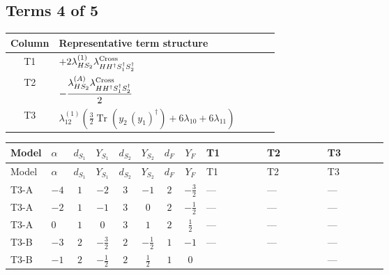 \documentclass[8pt]{article}
\begin{document}
\begin{landscape}
\subsection*{Terms 4 of 5}
\begin{center}
\begin{tabular}{@{}c >{\raggedright\arraybackslash}p{0.82\linewidth}@{}}
\toprule
Column & Representative term structure \\
\midrule
T1 & \(\displaystyle +2 {\lambda_{HS_2}^{(1)}} {\lambda_{H H^\dagger S_1^\dagger S_2^\dagger}^{\rm Cross}}\) \\
\midrule
T2 & \(\displaystyle -\frac{{\lambda_{HS_2}^{(A)}} {\lambda_{H H^\dagger S_1^\dagger S_2^\dagger}^{\rm Cross}}}{2}\) \\
\midrule
T3 & \(\displaystyle {\lambda_{12}^{(1)}} \left(\frac{3}{2} \operatorname{Tr}\!\left({y_2}\,\left({y_1}\right)^{\dagger}\right)+6 {\lambda_{10}}+6 {\lambda_{11}}\right)\) \\
\midrule
\bottomrule
\end{tabular}
\end{center}
\smallskip
\tiny
\begin{longtable}{@{}llcccccc >{\raggedright\arraybackslash}p{0.21\linewidth} >{\raggedright\arraybackslash}p{0.21\linewidth} >{\raggedright\arraybackslash}p{0.21\linewidth}@{}}
\toprule
Model & $\alpha$ & $d_{S_1}$ & $Y_{S_1}$ & $d_{S_2}$ & $Y_{S_2}$ & $d_F$ & $Y_F$ & T1 & T2 & T3 \\
\midrule
\endfirsthead
\toprule
Model & $\alpha$ & $d_{S_1}$ & $Y_{S_1}$ & $d_{S_2}$ & $Y_{S_2}$ & $d_F$ & $Y_F$ & T1 & T2 & T3 \\
\midrule
\endhead
T3-A & $-4$ & $1$ & $-2$ & $3$ & $-1$ & $2$ & $-\frac{3}{2}$ & --- & --- & --- \\
\midrule
T3-A & $-2$ & $1$ & $-1$ & $3$ & $0$ & $2$ & $-\frac{1}{2}$ & --- & --- & --- \\
\midrule
T3-A & $0$ & $1$ & $0$ & $3$ & $1$ & $2$ & $\frac{1}{2}$ & --- & --- & --- \\
\midrule
T3-B & $-3$ & $2$ & $-\frac{3}{2}$ & $2$ & $-\frac{1}{2}$ & $1$ & $-1$ & --- & --- & --- \\
\midrule
T3-B & $-1$ & $2$ & $-\frac{1}{2}$ & $2$ & $\frac{1}{2}$ & $1$ & $0$ & \scriptsize\adjustbox{max width=\linewidth}{$\begin{gathered} +2 {\lambda_{HS_2}^{(1)}} {\lambda_{H H^\dagger S_1^\dagger S_2^\dagger}^{\rm Cross}}\end{gathered}$} & \scriptsize\adjustbox{max width=\linewidth}{$\begin{gathered} -\frac{{\lambda_{HS_2}^{(A)}} {\lambda_{H H^\dagger S_1^\dagger S_2^\dagger}^{\rm Cross}}}{2}\end{gathered}$} & --- \\

\end{longtable}
\end{landscape}
\end{document}

